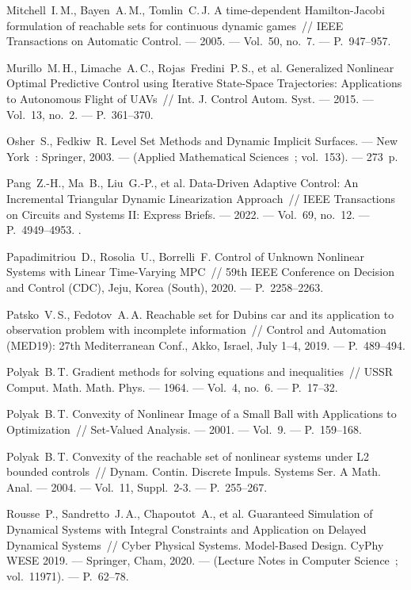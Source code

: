 \documentclass[../main.tex]{subfiles}
\begin{document}
\begin{thebibliography}{99}
Mitchell~I.\,M., Bayen~A.\,M., Tomlin~C.\,J. A time-dependent Hamilton-Jacobi formulation of reachable sets for continuous dynamic games~// IEEE Transactions on Automatic Control. --- 2005. --- Vol.~50, no.~7. --- P.~947--957.

Murillo~M.\,H., Limache~A.\,C., Rojas~Fredini~P.\,S., et al. Generalized Nonlinear Optimal Predictive Control using Iterative State-Space Trajectories: Applications to Autonomous Flight of UAVs~// Int. J. Control Autom. Syst. --- 2015. --- Vol.~13, no.~2. --- P.~361--370.

Osher~S., Fedkiw~R. Level Set Methods and Dynamic Implicit Surfaces. --- New York~: Springer, 2003. --- (Applied Mathematical Sciences~; vol.~153). --- 273~p.

Pang~Z.-H., Ma~B., Liu~G.-P., et al. Data-Driven Adaptive Control: An Incremental Triangular Dynamic Linearization Approach~// IEEE Transactions on Circuits and Systems II: Express Briefs. --- 2022. --- Vol.~69, no.~12. --- P.~4949--4953.
.

Papadimitriou~D., Rosolia~U., Borrelli~F. Control of Unknown Nonlinear Systems with Linear Time-Varying MPC~// 59th IEEE Conference on Decision and Control (CDC), Jeju, Korea (South), 2020. --- P.~2258--2263. 

Patsko~V.\,S., Fedotov~A.\,A. Reachable set for Dubins car and its application to observation problem with incomplete information~// Control and Automation (MED19): 27th Mediterranean Conf., Akko, Israel, July 1--4, 2019. --- P.~489--494.

Polyak~B.\,T. Gradient methods for solving equations and inequalities~// USSR Comput. Math. Math. Phys. --- 1964. --- Vol.~4, no.~6. --- P.~17--32.

Polyak~B.\,T. Convexity of Nonlinear Image of a Small Ball with Applications to Optimization~// Set-Valued Analysis. --- 2001. --- Vol.~9. --- P.~159--168. 

Polyak~B.\,T. Convexity of the reachable set of nonlinear systems under L2 bounded controls~// Dynam. Contin. Discrete Impuls. Systems Ser. A Math. Anal. --- 2004. --- Vol.~11, Suppl.~2-3. --- P.~255--267.

Rousse~P., Sandretto~J.\,A., Chapoutot~A., et al. Guaranteed Simulation of Dynamical Systems with Integral Constraints and Application on Delayed Dynamical Systems~// Cyber Physical Systems. Model-Based Design. CyPhy WESE 2019. --- Springer, Cham, 2020. --- (Lecture Notes in Computer Science~; vol.~11971). --- P.~62--78.


\end{thebibliography}
\end{document}
